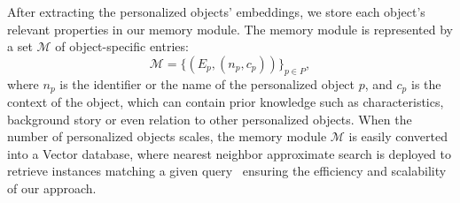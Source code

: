   After extracting the personalized objects' embeddings, we store  each object's relevant properties in our  memory module.  The memory module is represented by a set $\mathcal{M}$ of object-specific entries:
\vspace{-0.15cm}
\begin{equation}
    \mathcal{M}=\{ (E_p, (n_p, c_p)) \}_{p\in P},
\end{equation}
where $n_p$ is the identifier or the name of the personalized object $p$, and $c_p$ is the context of the object, which can contain prior knowledge such as characteristics, background story or even relation to other personalized objects.
When the number of personalized objects scales, the memory module $\mathcal{M}$ is easily converted into a Vector database, where nearest neighbor approximate search is deployed to retrieve instances matching a given query~\cite{han2023vector} ensuring the efficiency and scalability of our approach.

